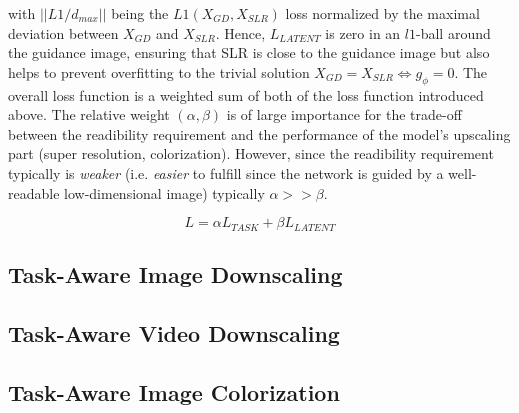 with $||L1/d_{max}||$ being the $L1(X_{GD}, X_{SLR})$ loss normalized
by the maximal deviation between $X_{GD}$ and $X_{SLR}$. Hence,
$L_{LATENT}$ is zero in an $l1$-ball around the guidance image, ensuring that
\ac{SLR} is close to the guidance image but also helps to prevent overfitting to
the trivial solution $X_{GD} = X_{SLR} \Leftrightarrow g_\phi = 0$.
\newline
The overall loss function is a weighted sum of both of the loss function
introduced above. The relative weight $(\alpha, \beta)$ is of large importance for the
trade-off between the readibility requirement and the performance of the model's
upscaling part (super resolution, colorization). However, since the readibility
requirement typically is \textit{weaker} (i.e. \textit{easier} to fulfill since
the network is guided by a well-readable low-dimensional image) typically
$\alpha >> \beta$.

$$L = \alpha L_{TASK} + \beta L_{LATENT}$$

\subsection{Task-Aware Image Downscaling}
\label{sec:Approach_ID}


\subsection{Task-Aware Video Downscaling}
\label{sec:Approach_VD}

\subsection{Task-Aware Image Colorization}
\label{sec:Approach_IC}


